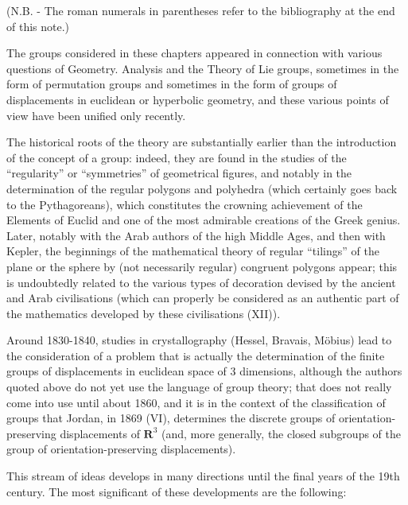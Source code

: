 
(N.B. - The roman numerals in parentheses refer to the bibliography at the end of this note.)

The groups considered in these chapters appeared in connection with various questions of Geometry. Analysis and the Theory of Lie groups, sometimes in the form of permutation groups and sometimes in the form of groups of displacements in euclidean or hyperbolic geometry, and these various points of view have been unified only recently.

The historical roots of the theory are substantially earlier than the introduction of the concept of a group: indeed, they are found in the studies of the ``regularity'' or ``symmetries'' of geometrical figures, and notably in the determination of the regular polygons and polyhedra (which certainly goes back to the Pythagoreans), which constitutes the crowning achievement of the Elements of Euclid and one of the most admirable creations of the Greek genius. Later, notably with the Arab authors of the high Middle Ages, and then with Kepler, the beginnings of the mathematical theory of regular ``tilings'' of the plane or the sphere by (not necessarily regular) congruent polygons appear; this is undoubtedly related to the various types of decoration devised by the ancient and Arab civilisations (which can properly be considered as an authentic part of the mathematics developed by these civilisations (XII)).

Around 1830-1840, studies in crystallography (Hessel, Bravais, Möbius) lead to the consideration of a problem that is actually the determination of the finite groups of displacements in euclidean space of 3 dimensions, although the authors quoted above do not yet use the language of group theory; that does not really come into use until about 1860, and it is in the context of the classification of groups that Jordan, in 1869 (VI), determines the discrete groups of orientation-preserving displacements of \(\mathbf{R}^3\) (and, more generally, the closed subgroups of the group of orientation-preserving displacements).

This stream of ideas develops in many directions until the final years of the 19th century. The most significant of these developments are the following:

